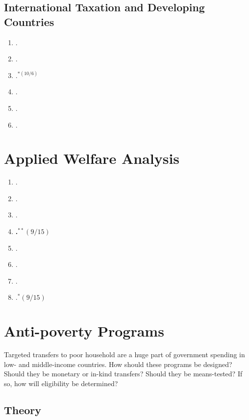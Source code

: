 \documentclass[11pt]{article}
\begin{document}
\subsection{International Taxation and Developing Countries}


\begin{enumerate}
\item {}.
\item {}.
\item {}.$^{*(10/6)}$
\item {}.
\item {}.
\item {}.
\end{enumerate}


\section{Applied Welfare Analysis}

\begin{enumerate}
\item {}.
\item {}.
\item {}.
\item \textbf{.$^{**}(9/15)$}
\item {}.
\item {}.
\item {}.
\item {}.$^{*}(9/15)$
\end{enumerate}

\section{ Anti-poverty Programs}
Targeted transfers to poor household are a huge part of government spending in low- and middle-income countries. How should these programs be designed? Should they be monetary or in-kind transfers? Should they be means-tested? If so, how will eligibility be determined?


\subsection{Theory}
\end{document}
